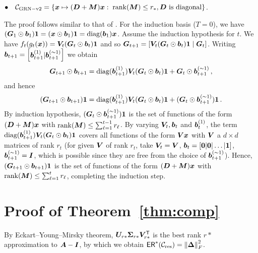 $\bullet \quad \mathcal{C}_{{\rm GRN-v2{}}} = \{\bm{x} \mapsto({\bm{D}}+{\bm{M}})\bm{x}:\; \operatorname{rank}({\bm{M}})\le r_*, {\bm{D}} \text{ is diagonal}\}$.

The proof follows similar to that of \GenA{}. For the induction basis ($T=0$), we have $({\bm{G}}_1 \odot\bm{b}_1)\boldsymbol{1} = (\bm{x}\odot \bm{b}_1)\boldsymbol{1} = \text{diag}(\bm{b}_1) \bm{x}$. Assume the induction hypothesis for $t$. We have $f_t(g_t(\bm{x})) = {\bm{V}}_t ({\bm{G}}_t\odot \bm{b}_t)\boldsymbol{1}$ and so ${\bm{G}}_{t+1} = [{\bm{V}}_t ({\bm{G}}_t\odot \bm{b}_t)\boldsymbol{1}\;|\;  {\bm{G}}_t]$. Writing $\bm{b}_{t+1} = \begin{bmatrix}\bm{b}_{t+1}^{(1)}| \bm{b}_{t+1}^{(\sim 1)}\end{bmatrix}$ we obtain
\[
{\bm{G}}_{t+1}\odot\bm{b}_{t+1} = \text{diag}(\bm{b}_{t+1}^{(1)}){\bm{V}}_t({\bm{G}}_t\odot \bm{b}_t)\boldsymbol{1} + {\bm{G}}_t \odot\bm{b}_{t+1}^{(\sim 1)}\,,
\]
and hence
\[
({\bm{G}}_{t+1}\odot\bm{b}_{t+1})\boldsymbol{1} = \text{diag}(\bm{b}_{t+1}^{(1)}){\bm{V}}_t({\bm{G}}_t\odot \bm{b}_t)\boldsymbol{1} + ({\bm{G}}_t \odot\bm{b}_{t+1}^{(\sim 1)})\boldsymbol{1}\,.
\]
By induction hypothesis, $({\bm{G}}_t \odot\bm{b}_{t+1}^{(\sim 1)})\boldsymbol{1}$ is the set of functions of the form $({\bm{D}}+{\bm{M}})\bm{x}$ with $\operatorname{rank}({\bm{M}})\le \sum_{\ell=1}^{t-1}r_\ell$. 
By varying ${\bm{V}}_t,\bm{b}_t$ and $\bm{b}_t^{(1)}$, the term $\text{diag}(\bm{b}_{t+1}^{(1)}){\bm{V}}_t({\bm{G}}_t\odot \bm{b}_t)\boldsymbol{1}$ covers all functions of the form ${\bm{V}} \bm{x}$ with ${\bm{V}}$ a $d\times d$ matrices of rank $r_t$ (for given ${\bm{V}}$ of rank $r_t$, take ${\bm{V}}_t = {\bm{V}}$, $\bm{b}_t = [\boldsymbol{0}|\boldsymbol{0}|\dotsc| \boldsymbol{1}]$, $\bm{b}^{(\sim 1)}_{t+1}=\bm{I}$, which is possible since they are free from the choice of $\bm{b}_{t+1}^{(\sim 1)}$). Hence, $({\bm{G}}_{t+1}\odot\bm{b}_{t+1})\boldsymbol{1}$ is the set of functions of the form $({\bm{D}}+{\bm{M}})\bm{x}$ with $\operatorname{rank}({\bm{M}})\le \sum_{\ell=1}^t r_\ell$, completing the induction step.

%
\section{Proof of Theorem~\ref{thm:comp}}

By Eckart–Young–Mirsky theorem, ${\bm{U}}_{r*}\boldsymbol{\Sigma}_{r*} {\bm{V}}_{r*}^{\sf T}$ is the best rank $r*$ approximation to ${\bm{A}}-\bm{I}$, by which we obtain ${\sf ER}^*(\mathcal{C}_{\rm res}) = \left\|\bm{\Delta}\right\|_{F}^2$. 

